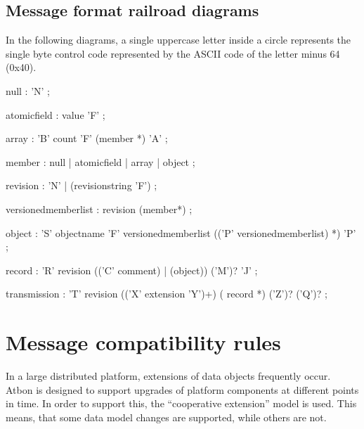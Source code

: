 \documentclass[11pt,a4paper,oneside]{article}
\begin{document}
\subsection{Message format railroad diagrams}
In the following diagrams, a single uppercase letter inside a circle represents the single byte control code represented by the ASCII code of the letter minus 64 (0x40).
 


\begin{rail}
null : 'N'
    ;
   
atomicfield : value 'F'
    ;
   
array :
    'B' count 'F' (member *) 'A'
    ;

member : null | atomicfield | array | object
    ;

revision : 'N' | (revisionstring 'F')
    ;
   
\end{rail}
        
\begin{rail}
versionedmemberlist :
    revision (member*)
    ;
\end{rail}
        
\begin{rail}
object :
    'S' objectname 'F' versionedmemberlist
          (('P' versionedmemberlist) *)
    'P'
    ;
\end{rail}
        
\begin{rail}
record :
    'R' revision
                          (('C' comment) | (object))
                                                    ('M')? 'J'
    ;
\end{rail}
        
\begin{rail}
transmission :
    'T' revision
    (('X' extension 'Y')+) 
    ( record *) 
    ('Z')?
    ('Q')?
    ;
\end{rail}

\vspace{8mm}


\section{Message compatibility rules}
In a large distributed platform, extensions of data objects frequently occur. Atbon is designed to support upgrades of platform
components at different points in time. In order to support this, the
``cooperative extension'' model is used. This means, that some data model changes are supported, while others are not.
\end{document}
